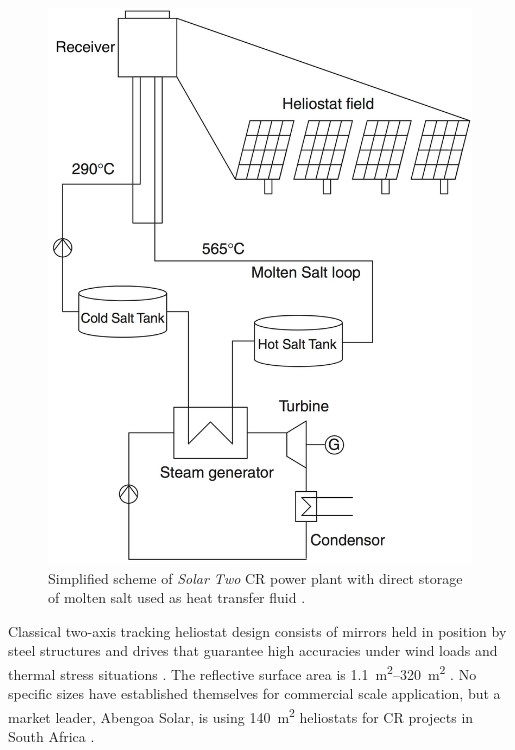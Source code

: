 \begin{figure}[htbp]  
\centering
\includegraphics[width=0.45\linewidth]{FIG/towerdirecttwotank}
\caption[Simplified scheme of \emph{Solar Two} CR power plant with direct storage of molten salt used as heat transfer fluid.]{Simplified scheme of \emph{Solar Two} CR power plant with direct storage of molten salt used as heat transfer fluid \cite{Richter2013}.}\label{towerdirecttwotank}
\end{figure}


Classical two-axis tracking heliostat design consists of mirrors held in position by steel structures and drives that guarantee high accuracies under wind loads and thermal stress situations \cite{Alexopoulos2013}. The reflective surface area is \SIrange{1.1}{320}{\square\metre} \cite{Blackmon2012,Tyner2014}. No specific sizes have established themselves for commercial scale application, but a market leader, Abengoa Solar, is using \SI{140}{\square\metre} heliostats for CR projects in South Africa \cite{Abengoa2014}.

